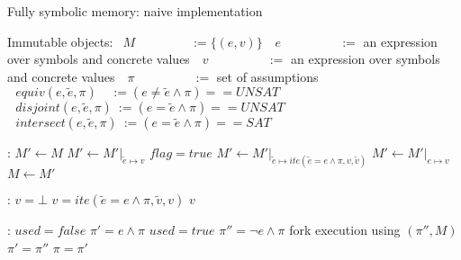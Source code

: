 \documentclass{article}
\begin{document}
\begin{algorithm}
  \normalsize

  \caption{Fully symbolic memory: naive implementation}
  \begin{algorithmic}
  	\State Immutable objects:
  	\State $~~M~~~~~~~~~~~~~~~~~~~\,:= \{(e,v)\}$ 
  	\State $~~~e~~~~~~~~~~~~~~~~~~~\,~:=$ an expression over symbols and concrete values
  	\State $~~~v~~~~~~~~~~~~~~~~~~~~\,:=$ an expression over symbols and concrete values
  	\State $~~~\pi~~~~~~~~~~~~~~~~~~~~\,:=$ set of assumptions
  	\State $~~~equiv(e, \widetilde{e}, \pi)~~~~\,:= (e \not = \widetilde{e} \wedge \pi) == UNSAT$ 
  	\State $~~~disjoint(e, \widetilde{e}, \pi)~:=  (e = \widetilde{e} \wedge \pi) == UNSAT$ 
  	\State $~~~intersect(e, \widetilde{e}, \pi)~:=  (e = \widetilde{e} \wedge \pi) == SAT$ 

  \end{algorithmic}
  \bigskip
  \begin{algorithmic}[1]
	:
		\State $M'  \leftarrow M$
	    		\State $M' \leftarrow M'\vert_{\widetilde{e} \mapsto v}$
	    		\State $flag = true$
	    	\Else
	    		\State $M' \leftarrow M'\vert_{\widetilde{e} \mapsto ite(\widetilde{e} = e \wedge \pi, v, \widetilde{v})}$
	    	\EndIf
	    \EndFor
	    	\State $M' \leftarrow M'\vert_{e \mapsto v}$
	    \EndIf
	    \State $M  \leftarrow M'$
	\EndFunction
  \end{algorithmic}
  \bigskip
  \begin{algorithmic}[1]
	:
		\State $v = \bot$ 
				\State $v = ite(\widetilde{e} = e \wedge \pi, \widetilde{v}, v)$
			\EndIf
		\EndFor
		\State \Return $v$
	\EndFunction
  \end{algorithmic}
  \bigskip
  \begin{algorithmic}[1]
	:
		\State $used = false$
			\State $\pi' = e \wedge \pi$
			\State $used = true$
		\EndIf
			\State $\pi'' = \neg e \wedge \pi$
				\State fork execution using $(\pi'', M)$
			\Else
				\State $\pi' = \pi''$
			\EndIf
		\EndIf
		\State $\pi = \pi'$
	\EndFunction
  \end{algorithmic}
\end{algorithm}
\end{document}
